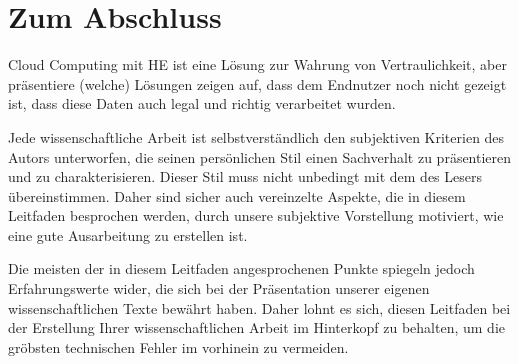 \chapter{Zum Abschluss}

Cloud Computing mit HE ist eine Lösung zur Wahrung von Vertraulichkeit, aber präsentiere (welche) Lösungen zeigen auf, dass dem Endnutzer noch nicht gezeigt ist, dass diese Daten auch legal und richtig verarbeitet wurden.

Jede wissenschaftliche Arbeit ist selbstverständlich den subjektiven
Kriterien des Autors unterworfen, die seinen persönlichen Stil einen
Sachverhalt zu präsentieren und zu charakterisieren. 
Dieser Stil muss nicht unbedingt mit dem des Lesers
übereinstimmen. Daher sind sicher auch vereinzelte Aspekte, die in
diesem Leitfaden besprochen werden, durch unsere subjektive
Vorstellung motiviert, wie eine gute Ausarbeitung zu erstellen ist.

Die meisten der in diesem Leitfaden angesprochenen Punkte spiegeln
jedoch  Erfahrungswerte wider, die sich
bei der Präsentation unserer eigenen wissenschaftlichen Texte bewährt
haben. Daher lohnt es sich, diesen Leitfaden bei der Erstellung Ihrer
wissenschaftlichen Arbeit im Hinterkopf zu behalten, um die gröbsten
technischen Fehler im vorhinein zu vermeiden.
